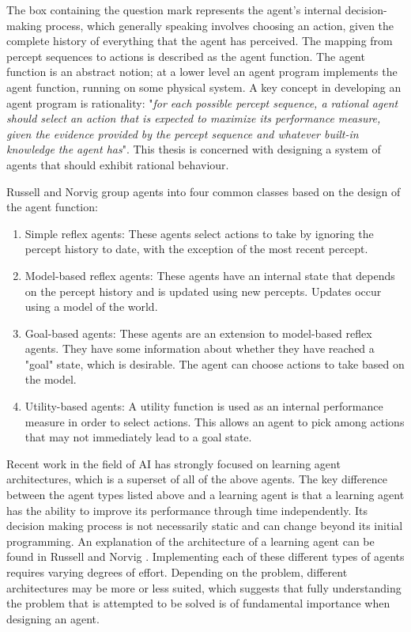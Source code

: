 The box containing the question mark represents the agent's internal decision-making process, which generally speaking involves choosing an action, given the complete history of everything that the agent has perceived. The mapping from percept sequences to actions is described as the agent function. The agent function is an abstract notion; at a lower level an agent program implements the agent function, running on some physical system. A key concept in developing an agent program is rationality: "\textit{for each possible percept sequence, a rational agent should select an action that is expected to maximize its performance measure, given the evidence provided by the percept sequence and whatever built-in knowledge the agent has}"\cite[p.~37]{AIAMA}. This thesis is concerned with designing a system of agents that should exhibit rational behaviour.\newline
 

Russell and Norvig group agents into four common classes based on the design of the agent function\cite[p.~47]{AIAMA}: 
\begin{enumerate}
    \item Simple reflex agents: These agents select actions to take by ignoring the percept history to date, with the exception of the most recent percept.
    \item Model-based reflex agents: These agents have an internal state that depends on the percept history and is updated using new percepts. Updates occur using a model of the world.
    \item Goal-based agents: These agents are an extension to model-based reflex agents. They have some information about whether they have reached a "goal" state, which is desirable. The agent can choose actions to take based on the model. %
    \item Utility-based agents: A utility function is used as an internal performance measure in order to select actions. This allows an agent to pick among actions that may not immediately lead to a goal state.
\end{enumerate}
Recent work in the field of AI has strongly focused on learning agent architectures, which is a superset of all of the above agents. The key difference between the agent types listed above and a learning agent is that a learning agent has the ability to improve its performance through time independently. Its decision making process is not necessarily static and can change beyond its initial programming. An explanation of the architecture of a learning agent can be found in Russell and Norvig \cite[p.~55]{AIAMA}. Implementing each of these different types of agents requires varying degrees of effort. Depending on the problem, different architectures may be more or less suited, which suggests that fully understanding the problem that is attempted to be solved is of fundamental importance when designing an agent.

